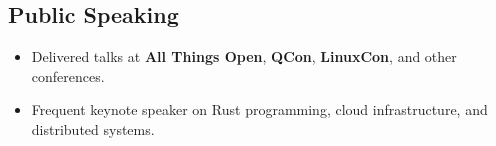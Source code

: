 \documentclass[margin,line]{resume}
\begin{document}
\begin{resume}
\vspace{10pt}

\section{Public Speaking}
\begin{itemize}[leftmargin=0.5cm]
\item Delivered talks at \textbf{All Things Open}, \textbf{QCon}, \textbf{LinuxCon}, and other conferences.
\item Frequent keynote speaker on Rust programming, cloud infrastructure, and distributed systems.
\end{itemize}

\end{resume}
\end{document}
